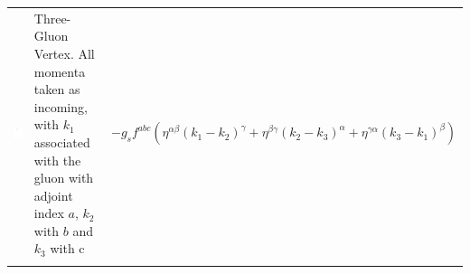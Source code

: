 \begin{table}[h!]
\begin{tabular}{ | c | m{5cm} | m{5cm} | }
\begin{minipage}{.3\textwidth}
      \includegraphics[scale=0.7]{Images/3g_vert.pdf}
    \end{minipage}
    &
    Three-Gluon Vertex. All momenta taken as incoming, with $k_1$ associated with the gluon with adjoint index $a$, $k_2$ with $b$ and $k_3$ with c
    & 
    \begin{minipage}{5cm}
    \centering
     $ -g_s f^{abc} ( \eta^{\alpha \beta}(k_1 - k_2)^\gamma
     + \eta^{\beta \gamma}(k_2 -k _3)^\alpha
     + \eta^{\gamma \alpha}(k_3 - k_1)^\beta ) $
    \end{minipage}
    \\ [\VSpace]
        	\begin{minipage}{.3\textwidth}

\end{minipage}
\end{tabular}
\end{table}
